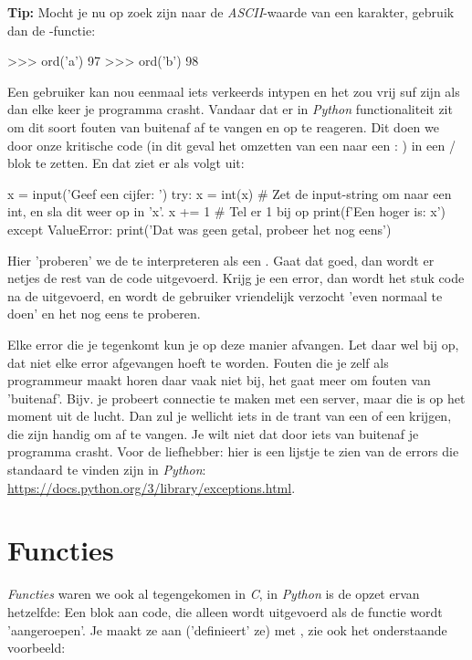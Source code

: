 \begin{remark}
\textbf{Tip: } Mocht je nu op zoek zijn naar de \textit{ASCII}-waarde van een karakter, gebruik dan de -functie:
\begin{python}
>>> ord('a')
97
>>> ord('b')
98
\end{python}
\end{remark}

Een gebruiker kan nou eenmaal iets verkeerds intypen en het zou vrij suf zijn als dan elke keer je programma crasht. Vandaar dat er in \textit{Python} functionaliteit zit om dit soort fouten van buitenaf af te vangen en op te reageren. Dit doen we door onze kritische code (in dit geval het omzetten van een  naar een : ) in een  /  blok te zetten. En dat ziet er als volgt uit:

\begin{python}
x = input('Geef een cijfer: ')
try:
	x = int(x)  # Zet de input-string om naar een int, en sla dit weer op in 'x'.
	x += 1  # Tel er 1 bij op
	print(f'Een hoger is: {x}')
except ValueError:
    print('Dat was geen getal, probeer het nog eens')
\end{python}

Hier 'proberen' we de  te interpreteren als een . Gaat dat goed, dan wordt er netjes de rest van de code uitgevoerd. Krijg je een error, dan wordt het stuk code na de  uitgevoerd, en wordt de gebruiker vriendelijk verzocht 'even normaal te doen' en het nog eens te proberen. \newline

Elke error die je tegenkomt kun je op deze manier afvangen. Let daar wel bij op, dat niet elke error afgevangen hoeft te worden. Fouten die je zelf als programmeur maakt horen daar vaak niet bij, het gaat meer om fouten van 'buitenaf'. Bijv. je probeert connectie te maken met een server, maar die is op het moment uit de lucht. Dan zul je wellicht iets in de trant van een  of een  krijgen, die zijn handig om af te vangen. Je wilt niet dat door iets van buitenaf je programma crasht. Voor de liefhebber: hier is een lijstje te zien van de errors die standaard te vinden zijn in \textit{Python}: \url{https://docs.python.org/3/library/exceptions.html}.

\newpage

\section{Functies}
\textit{Functies} waren we ook al tegengekomen in \textit{C}, in \textit{Python} is de opzet ervan hetzelfde: Een blok aan code, die alleen wordt uitgevoerd als de functie wordt 'aangeroepen'. Je maakt ze aan ('definieert' ze) met , zie ook het onderstaande voorbeeld:


